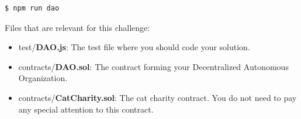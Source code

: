 \documentclass[12pt]{article}
\begin{document}
\begin{verbatim}
$ npm run dao
\end{verbatim}

\noindent
Files that are relevant for this challenge:
\begin{itemize}
\item test/\textbf{DAO.js}: The test file where you should code your solution.
\item contracts/\textbf{DAO.sol}: The contract forming your Decentralized Autonomous Organization.
\item contracts/\textbf{CatCharity.sol}: The cat charity contract. You do not need to pay any special attention to this contract.
\end{itemize}
\end{document}
